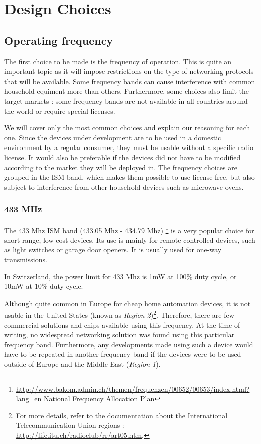 \chapter{Design Choices}\label{ch:choices}

\section{Operating frequency}\label{sec:frequency}

The first choice to be made is the frequency of operation. This is quite an
important topic as it will impose restrictions on the type of networking
protocols that will be available. Some frequency bands can cause interference
with common household equiment more than others. Furthermore, some choices also
limit the target markets : some frequency bands are not available in all
countries around the world or require special licenses.

We will cover only the most common choices and explain our reasoning for each
one. Since the devices under development are to be used in a domestic
environment by a regular consumer, they must be usable without a specific radio
license. It would also be preferable if the devices did not have to be modified
according to the market they will be deployed in. The frequency choices are
grouped in the \ac{ISM} band, which makes them possible to use license-free, but
also subject to interference from other household devices such as microwave
ovens.

\subsection{433 MHz}

The 433 Mhz ISM band (433.05 Mhz - 434.79 Mhz)
\footnote{\url{http://www.bakom.admin.ch/themen/frequenzen/00652/00653/index.html?lang=en}
National Frequency Allocation Plan} is a very popular choice for short range,
low cost devices. Its use is mainly for remote controlled devices, such as light
switches or garage door openers. It is usually used for one-way transmissions.

In Switzerland, the power limit for 433 Mhz is 1mW at 100\% duty cycle, or 10mW
at 10\% duty cycle.


Although quite common in Europe for cheap home automation
devices, it is not usable in the United States (known as \emph{Region
2})\footnote{For more details, refer to the documentation about the
  International Telecommunication Union regions
  : \url{http://life.itu.ch/radioclub/rr/art05.htm}.}.
Therefore, there are few commercial solutions and chips available using this
frequency. At the time of writing, no widespread networking solution was found
using this particular frequency band.  Furthermore, any developments made using
such a device would have to be repeated in another frequency band if the devices
were to be used outside of Europe and the Middle East (\emph{Region 1}).

